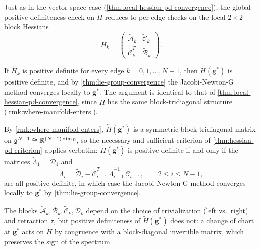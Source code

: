 Just as in the vector space case (\cref{thm:local-hessian-pd-convergence}), the global positive-definiteness check on $\widetilde{H}$ reduces to per-edge checks on the local $2 \times 2$-block Hessians
\[
	\widetilde{H}_k = \begin{pmatrix}
		\widetilde{\mathcal{A}}_k   & \widetilde{\mathcal{C}}_k \\
		\widetilde{\mathcal{C}}_k^T & \widetilde{\mathcal{B}}_k
	\end{pmatrix}.
\]

\begin{remark}\label{rmk:lie-local-hessian}
	If $\widetilde{H}_k$ is positive definite for every edge $k = 0, 1, \ldots, N-1$, then $\widetilde{H}(\mathbf{g}^*)$ is positive definite, and by \cref{thm:lie-group-convergence} the Jacobi-Newton-G method converges locally to $\mathbf{g}^*$. The argument is identical to that of \cref{thm:local-hessian-pd-convergence}, since $\widetilde{H}$ has the same block-tridiagonal structure (\cref{rmk:where-manifold-enters}).
\end{remark}

\begin{remark}\label{rmk:lie-hessian-pd-criterion}
	By \cref{rmk:where-manifold-enters}, $\widetilde{H}(\mathbf{g}^*)$ is a symmetric block-tridiagonal matrix on ${\mathfrak{g}}^{N-1} \cong {\mathbb{R}}^{(N-1)\dim{\mathfrak{g}}}$, so the necessary and sufficient criterion of \cref{thm:hessian-pd-criterion} applies verbatim: $\widetilde{H}(\mathbf{g}^*)$ is positive definite if and only if the matrices $\widetilde{\Lambda}_1 = \widetilde{\mathcal{D}}_1$ and
	\[
		\widetilde{\Lambda}_i = \widetilde{\mathcal{D}}_i - \widetilde{\mathcal{C}}_{i-1}^T\, \widetilde{\Lambda}_{i-1}^{-1}\, \widetilde{\mathcal{C}}_{i-1},
		\qquad 2 \leq i \leq N - 1,
	\]	are all positive definite, in which case the Jacobi-Newton-G method converges locally to $\mathbf{g}^*$ by \cref{thm:lie-group-convergence}.
\end{remark}

The blocks $\widetilde{\mathcal{A}}_k, \widetilde{\mathcal{B}}_k, \widetilde{\mathcal{C}}_k, \widetilde{\mathcal{D}}_k$ depend on the choice of trivialization (left vs.\ right) and retraction $\tau$, but positive definiteness of $\widetilde{H}(\mathbf{g}^*)$ does not: a change of chart at $\mathbf{g}^*$ acts on $\widetilde{H}$ by congruence with a block-diagonal invertible matrix, which preserves the sign of the spectrum.

